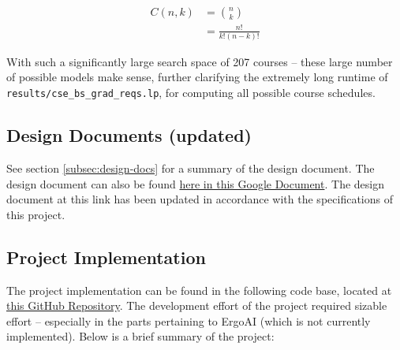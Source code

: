 \documentclass[12pt]{article}
\def \repoLink{https://github.com/AdebayoBraimah/CSE505}
\def \desDocLink{https://docs.google.com/document/d/1t48in8rdzC_VOijfAOP23C_YgAQxkow5eaE7AXEVUYM/edit?usp=sharing}
\begin{document}
    \begin{equation}
        \begin{aligned}
            C(n, k) & = \binom{n}{k} \\
            & =\frac{n!}{k!(n-k)!}
        \end{aligned}
        \label{eq:combo}
    \end{equation}

    With such a significantly large search space of 207 courses -- these large number of possible models make sense, further clarifying the extremely long runtime of {\tt{results/cse\_bs\_grad\_reqs.lp}}, for computing all possible course schedules.

    \subsection{Design Documents (updated)}
    \label{subsec:des-doc-up}

    See section \ref{subsec:design-docs} for a summary of the design document. The design document can also be found \href{\desDocLink}{here in this Google Document}. The design document at this link has been updated in accordance with the specifications of this project.

    \subsection{Project Implementation}
    \label{subsec:proj-imp}

    The project implementation can be found in the following code base, located at \href{\repoLink}{this GitHub Repository}. The development effort of the project required sizable effort -- especially in the parts pertaining to ErgoAI (which is not currently implemented). Below is a brief summary of the project:
\end{document}
